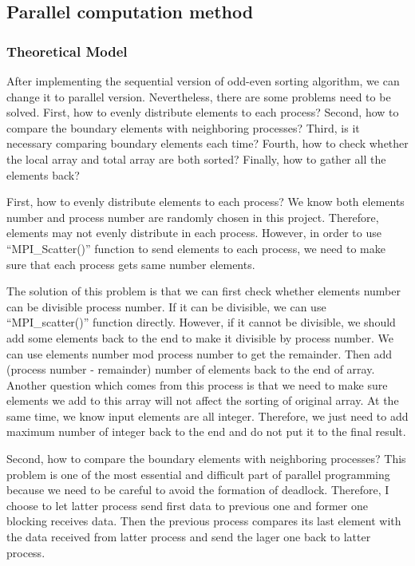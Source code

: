 \subsection{Parallel computation method}

\subsubsection{Theoretical Model}

After implementing the sequential version of odd-even sorting algorithm, we can change it to parallel version. Nevertheless, there are some problems need to be solved. First, how to evenly distribute elements to each process? Second, how to compare the boundary elements with neighboring processes? Third, is it necessary comparing boundary elements each time? Fourth, how to check whether the local array and total array are both sorted? Finally, how to gather all the elements back?

First, how to evenly distribute elements to each process? We know both elements number and process number are randomly chosen in this project. Therefore, elements may not evenly distribute in each process. However, in order to use “MPI\_Scatter()” function to send elements to each process, we need to make sure that each process gets same number elements. 

The solution of this problem is that we can first check whether elements number can be divisible process number. If it can be divisible, we can use “MPI\_scatter()” function directly. However, if it cannot be divisible, we should add some elements back to the end to make it divisible by process number. We can use elements number mod process number to get the remainder. Then add (process number - remainder) number of elements back to the end of array. Another question which comes from this process is that we need to make sure elements we add to this array will not affect the sorting of original array. At the same time, we know input elements are all integer. Therefore, we just need to add maximum number of integer back to the end and do not put it to the final result.

Second, how to compare the boundary elements with neighboring processes? This problem is one of the most essential and difficult part of parallel programming because we need to be careful to avoid the formation of deadlock. Therefore, I choose to let latter process send first data to previous one and former one blocking receives data. Then the previous process compares its last element with the data received from latter process and send the lager one back to latter process. 

